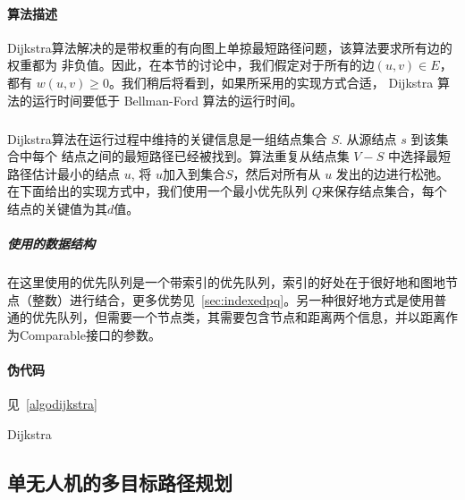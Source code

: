 \documentclass[UTF8,a4paper]{ctexart}
\begin{document}
\paragraph{算法描述}Dijkstra算法解决的是带权重的有向图上单掠最短路径问题，该算法要求所有边的权重都为 非负值。因此，在本节的讨论中，我们假定对于所有的边$(u,v)\in E$，都有 $w(u,v)\geq 0$。我们稍后将看到，如果所采用的实现方式合适， Dijkstra 算法的运行时间要低于 Bellman-Ford 算法的运行时间。
\subparagraph{}Dijkstra算法在运行过程中维持的关键信息是一组结点集合 {$S$}. 从源结点 {$s$} 到该集合中每个 结点之间的最短路径已经被找到。算法重复从结点集 $V-S$ 中选择最短路径估计最小的结点 $u$, 将 $u$加入到集合$S$，然后对所有从 $u$ 发出的边进行松弛。在下面给出的实现方式中，我们使用一个最小优先队列 $Q$来保存结点集合，每个结点的关键值为其$d$值。
\subparagraph{使用的数据结构}在这里使用的优先队列是一个带索引的优先队列，索引的好处在于很好地和图地节点（整数）进行结合，更多优势见~\ref{sec:indexedpq}。另一种很好地方式是使用普通的优先队列，但需要一个节点类，其需要包含节点和距离两个信息，并以距离作为Comparable接口的参数。
\paragraph{伪代码}见~\ref{algodijkstra}
\begin{algorithm}
    \caption{Dijkstra}\label{algodijkstra}
    \begin{algorithmic}[1] %
        \EndFor
        \EndFunction
        \State
        \EndIf
        \EndFunction
        \State
        \State {}
        \State {}
        \EndFor
        \EndWhile
        \EndFunction
    \end{algorithmic}
\end{algorithm}

\subsection{单无人机的多目标路径规划}\label{sec:solutionTSP}
\end{document}
